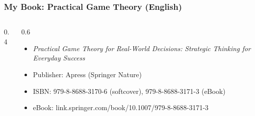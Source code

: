 
\begin{frame}[fragile]\frametitle{My Book: Practical Game Theory (English)}
\begin{columns}
    \begin{column}[T]{0.4\linewidth}
		\begin{center}
		\end{center}
    \end{column}
    \begin{column}[T]{0.6\linewidth}
		\begin{itemize}
		\item \emph{Practical Game Theory for Real-World Decisions: Strategic Thinking for Everyday Success}
		\item Publisher: Apress (Springer Nature)
		\item ISBN: 979-8-8688-3170-6 (softcover), 979-8-8688-3171-3 (eBook)
		\item eBook: link.springer.com/book/10.1007/979-8-8688-3171-3
		\end{itemize}
		\begin{center}
		\end{center}
    \end{column}
\end{columns}
\end{frame}
